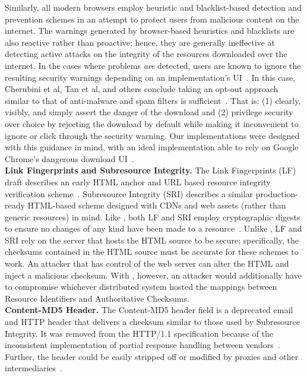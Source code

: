 Similarly, all modern browsers employ heuristic and blacklist-based detection
and prevention schemes in an attempt to protect users from malicious content on
the internet. The warnings generated by browser-based heuristics and blacklists
are also reactive rather than proactive; hence, they are generally ineffective
at detecting active attacks on the integrity of the resources downloaded over
the internet. In the cases where problems \emph{are} detected, users are known
to ignore the resulting security warnings depending on an implementation's
UI~\cite{Modic, Akhawe, ChromeClickThrough}. In this case, Cherubini et al, Tan
et al, and others conclude taking an opt-out approach similar to that of
anti-malware and spam filters is sufficient~\cite{Cherubini, Tan}. That is: (1)
clearly, visibly, and simply assert the danger of the download and (2) privilege
security over choice by rejecting the download by default while making it
inconvenient to ignore or click through the security warning. Our \SYSTEM{}
implementations were designed with this guidance in mind, with an ideal
implementation able to rely on Google Chrome's dangerous download
UI~\cite{ChromeClickThrough}. \\

\noindent\textbf{Link Fingerprints and Subresource Integrity.} The Link
Fingerprints (LF) draft describes an early HTML anchor and URL based resource
integrity verification scheme~\cite{LF}. Subresource Integrity (SRI) describes a
similar production-ready HTML-based scheme designed with CDNs and web assets
(rather than generic resources) in mind. Like \SYSTEM{}, both LF and SRI employ
cryptographic digests to ensure no changes of any kind have been made to a
resource~\cite{SRI}. Unlike \SYSTEM{}, LF and SRI rely on the server that hosts
the HTML source to be secure; specifically, the checksums contained in the HTML
source must be accurate for these schemes to work. An attacker that has control
of the web server can alter the HTML and inject a malicious checksum. With
\SYSTEM{}, however, an attacker would additionally have to compromise whichever
distributed system hosted the mappings between Resource Identifiers and
Authoritative Checksums. \\

\noindent\textbf{Content-MD5 Header.} The Content-MD5 header field is a
deprecated email and HTTP header that delivers a checksum similar to those used
by Subresource Integrity. It was removed from the HTTP/1.1 specification because
of the inconsistent implementation of partial response handling between
vendors~\cite{HTTP1.1}. Further, the header could be easily stripped off or
modified by proxies and other intermediaries~\cite{MD5Header}. \\

